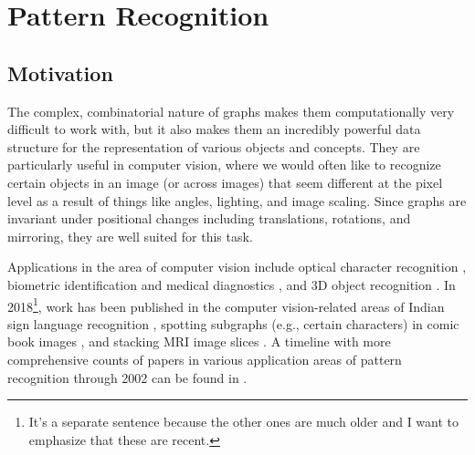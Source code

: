 \documentclass[12pt]{thesis}
\theoremstyle{plain}
\theoremstyle{definition}
\theoremstyle{remark}
\begin{document}








\chapter{Pattern Recognition}\label{chapter:pattern_recognition}
 
\section{Motivation}

The complex, combinatorial nature of graphs makes them computationally very difficult to work with, but it also makes them an incredibly powerful data structure for the representation of various objects and concepts. They are particularly useful in computer vision, where we would often like to recognize certain objects in an image (or across images) that seem different at the pixel level as a result of things like angles, lighting, and image scaling. Since graphs are invariant under positional changes including translations, rotations, and mirroring, they are well suited for this task.

Applications in the area of computer vision include optical character recognition \cite{Lu_1991,Rocha_1994}, biometric identification \cite{isenor1986fingerprint,deng2010retinal} and medical diagnostics \cite{sharma2012determining}, and 3D object recognition \cite{Christmas_1995}. In 2018\footnote{It's a separate sentence because the other ones are much older and I want to emphasize that these are recent.}, work has been published in the computer vision-related areas of Indian sign language recognition \cite{Kumar_2018a,Kumar_2018b}, spotting subgraphs (e.g., certain characters) in comic book images \cite{le2018ssgci}, and stacking MRI image slices \cite{clough2018mri}. A timeline with more comprehensive counts of papers in various application areas of pattern recognition through 2002 can be found in \cite{Conte_2004}.
\end{document}
